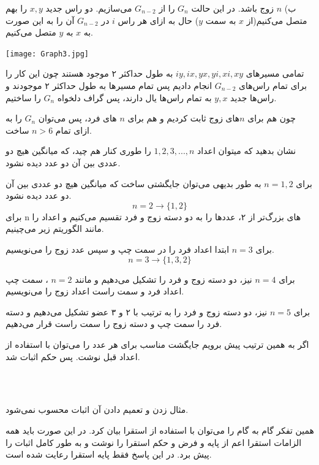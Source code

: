 \documentclass[11pt,largemargins]{h2wp}
\begin{document}
    ب) $n$ زوج باشد. در این حالت $G_{n}$ را از $G_{n-2}$ می‌سازیم. دو راس جدید $x, y$ را بهم متصل می‌کنیم(از $x$ به سمت $y$) حال به ازای هر راس $i$ در $G_{n-2}$ آن را به این صورت به $x$ به $y$ متصل می‌کنیم.
    
        {\hspace*{6cm}\texttt{[image: Graph3.jpg]}}      
    
    تمامی مسیر‌های $iy, ix, yx, yi, xi, xy$ به طول حداکثر ۲ موجود هستند چون این کار را برای تمام راس‌های $G_{n-2}$ انجام دادیم پس تمام مسیرها به طول حداکثر ۲ موجودند و راس‌ها جدید $y, x$ به تمام راس‌ها یال دارند، پس گراف دلخواه $G_{n}$ را ساختیم.
    
    چون هم برای $n$های زوج ثابت کردیم و هم برای $n$ های فرد، پس می‌توان $G_{n}$ را به ازای تمام 
    $n>6$ ساخت.

\question

 نشان بدهید که میتوان اعداد $1,2,3,...,n$ را طوری کنار هم چید، که میانگین هیچ دو عددی بین آن دو عدد دیده نشود. 
 
 \solution
 برای $ n= 1 , 2$
 به طور بدیهی می‌توان جایگشتی ساخت که میانگین هیچ دو عددی بین آن دو عدد دیده نشود. 
 $$ n = 2 \rightarrow \{ 1, 2 \} $$
 برای n های بزرگ‌تر از ۲، عددها را به دو دسته زوج و فرد تقسیم می‌کنیم و اعداد را مانند الگوریتم زیر می‌چینیم.
 
 برای $ n=3 $ ابتدا اعداد فرد را در سمت چپ و سپس عدد زوج را می‌نویسیم. 
 $$ n=3 \rightarrow \{ 1, 3 ,2 \} $$
  
 برای $ n =4 $ نیز، دو دسته زوج و فرد را تشکیل می‌دهیم و مانند $ n =2 $ ، سمت چپ اعداد فرد و سمت راست اعداد زوج را می‌نویسیم.
 
 برای $ n = 5 $ نیز، دو دسته زوج و فرد را به ترتیب با ۲ و ۳ عضو تشکیل می‌دهیم و دسته فرد را سمت چپ و دسته زوج‌ را سمت راست قرار می‌دهیم.
 ‌ 
 
 اگر به همین ترتیب پیش برویم جایگشت مناسب برای هر عدد را می‌توان با استفاده از اعداد قبل نوشت. پس حکم اثبات شد.
 
  
 \notes
 \\%
\\%
 
 
 مثال زدن و تعمیم دادن آن اثبات محسوب نمی‌شود.
 
 همین تفکر گام به گام را می‌توان با استفاده از استقرا بیان کرد. در این صورت باید همه الزامات استقرا اعم از پایه و فرض و حکم استقرا را نوشت و به طور کامل اثبات را پیش برد. در این پاسخ فقط پایه استقرا رعایت شده است. 
 
\end{document}
